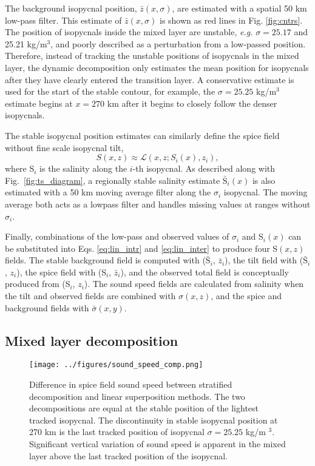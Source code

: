 \documentclass[preprint,NumberedRefs]{JASA}
\begin{document}
The background isopycnal position, $\bar{z}(x, \sigma)$, are estimated with a spatial 50 km low-pass filter. This estimate of $\bar{z}(x, \sigma)$ is shown as red lines in Fig. \ref{fig:cntrs}. The position of isopycnals inside the mixed layer are unstable, \emph{e.g.} $\sigma=25.17$ and 25.21 kg/m$^3$, and poorly described as a perturbation from a low-passed position. Therefore, instead of tracking the unstable positions of isopycnals in the mixed layer, the dynamic decomposition only estimates the mean position for isopycnals after they have clearly entered the transition layer. A conservative estimate is used for the start of the stable contour, for example, the $\sigma=25.25$ kg/m$^3$ estimate begins at $x=270$ km after it begins to closely follow the denser isopycnals.

The stable isopycnal position estimates can similarly define the spice field without fine scale isopycnal tilt,
\begin{equation}
    S(x, z)\approx\mathcal{L}(x, z; S_i(x), z_i),
    \label{eq:lin_inter}
\end{equation}
where S$_i$ is the salinity along the $i$-th isopycnal. As described along with Fig.~\ref{fig:ts_diagram}, a regionally stable salinity estimate $\bar{\textrm{S}}_i(x)$ is also estimated with a 50 km moving average filter along the $\sigma_i$ isopycnal. The moving average both acts as a lowpass filter and handles missing values at ranges without $\sigma_i$.

Finally, combinations of the low-pass and observed values of $\sigma_i$ and S$_i(x)$ can be substituted into Eqs. \eqref{eq:lin_intr} and \eqref{eq:lin_inter} to produce four S$(x,z)$ fields. The stable background field is computed with ($\bar{\textrm{S}}_i$, $\bar{z}_i$), the tilt field with ($\bar{\textrm{S}}_i$, $z_i$), the spice field with (S$_i$, $\bar{z}_i$), and the observed total field is conceptually produced from (S$_i$, $z_i$). The sound speed fields are calculated from salinity when the tilt and observed fields are combined with $\sigma(x,z)$, and the spice and background fields with $\bar{\sigma}(x,y)$\citep{TEOS10}.

\subsection{Mixed layer decomposition}\label{ssec:ml_decomp}
\begin{figure}
\texttt{[image: ../figures/sound\_speed\_comp.png]}
    \caption{\label{fig:c_diff}{Difference in spice field sound speed between stratified decomposition and linear superposition methods. The two decompositions are equal at the stable position of the lightest tracked isopycnal. The discontinuity in stable isopycnal position at 270 km is the last tracked position of isopycnal $\sigma=25.25$ kg/m $^3$. Significant vertical variation of sound speed is apparent in the mixed layer above the last tracked position of the isopycnal.}}
\end{figure}
\end{document}

